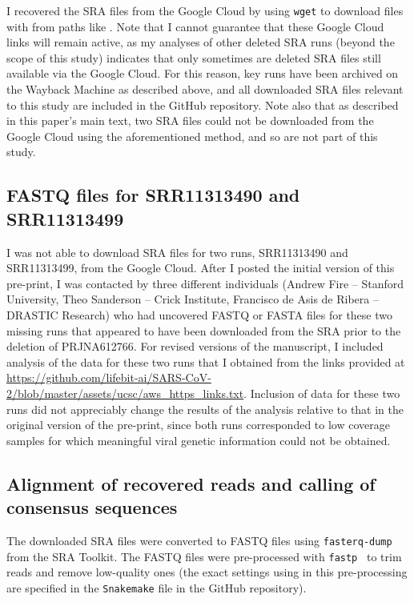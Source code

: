 \documentclass[9pt,twocolumn,twoside]{gsajnl_modified}
\begin{document}
{I recovered the SRA files from the Google Cloud by using \texttt{wget} to download files with from paths like .
Note that I cannot guarantee that these Google Cloud links will remain active, as my analyses of other deleted SRA runs (beyond the scope of this study) indicates that only sometimes are deleted SRA files still available via the Google Cloud.
For this reason, key runs have been archived on the Wayback Machine as described above, and all downloaded SRA files relevant to this study are included in the GitHub repository.
Note also that as described in this paper's main text, two SRA files could not be downloaded from the Google Cloud using the aforementioned method, and so are not part of this study.

\subsection{FASTQ files for SRR11313490 and SRR11313499}
I was not able to download SRA files for two runs, SRR11313490 and SRR11313499, from the Google Cloud.
After I posted the initial version of this pre-print, I was contacted by three different individuals (Andrew Fire -- Stanford University, Theo Sanderson -- Crick Institute, Francisco de Asis de Ribera -- DRASTIC Research) who had uncovered FASTQ or FASTA files for these two missing runs that appeared to have been downloaded from the SRA prior to the deletion of PRJNA612766.
For revised versions of the manuscript, I included analysis of the data for these two runs that I obtained from the links provided at \url{https://github.com/lifebit-ai/SARS-CoV-2/blob/master/assets/ucsc/aws_https_links.txt}.
Inclusion of data for these two runs did not appreciably change the results of the analysis relative to that in the original version of the pre-print, since both runs corresponded to low coverage samples for which meaningful viral genetic information could not be obtained.

\subsection{Alignment of recovered reads and calling of consensus sequences}
The downloaded SRA files were converted to FASTQ files using \texttt{fasterq-dump} from the SRA Toolkit.
The FASTQ files were pre-processed with \texttt{fastp}~\citep{chen2018fastp} to trim reads and remove low-quality ones (the exact settings using in this pre-processing are specified in the \texttt{Snakemake} file in the GitHub repository).

}
\end{document}
